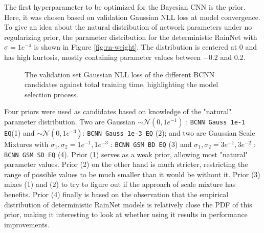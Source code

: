 The first hyperparameter to be optimized for the Bayesian CNN is the prior. Here, it was chosen based on validation Gaussian NLL loss at model convergence. To give an idea about the natural distribution of network parameters under no regularizing prior, the parameter distribution for the deterministic RainNet with $\sigma = 1e^{-4}$ is shown in Figure \ref{fig:rn-weight}. The distribution is centered at 0 and has high kurtosis, mostly containing parameter values between  $-0.2$ and $0.2$. 


\begin{figure}[H]
	\centering
	\caption{The validation set Gaussian NLL loss of the different BCNN candidates against total training time, highlighting the model selection process.}
	\label{fig:convergence-bcnn}
\end{figure}

Four priors were used as candidates based on knowledge of the "natural" parameter distribution. Two are Gaussian $\sim \mathcal{N}(0,1e^{-1})$ : \texttt{BCNN Gauss 1e-1 EQ}(1) and $\sim \mathcal{N}(0,1e^{-3})$: \texttt{BCNN Gauss 1e-3 EQ} (2); and two are Gaussian Scale Mixtures with $\sigma_1,\sigma_2 = 1e^{-1}, 1e^{-3}$ : \texttt{BCNN GSM BD EQ} (3) and $\sigma_1,\sigma_2 = 3e^{-1}, 3e^{-2}$ : \texttt{BCNN GSM SD EQ} (4). Prior (1) serves as a weak prior, allowing most "natural" parameter values. Prior (2) on the other hand is much stricter, restricting the range of possible values to be much smaller than it would be without it. Prior (3) mixes (1) and (2) to try to figure out if the approach of scale mixture has benefits. Prior (4) finally is based on the observation that the empirical distribution of deterministic RainNet models is relatively close the PDF of this prior, making it interesting to look at whether using it results in performance improvements.

